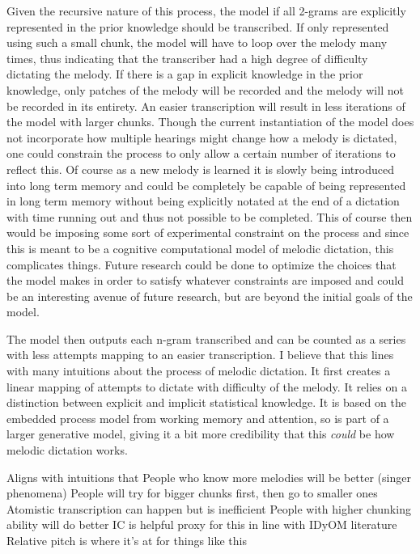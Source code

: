\documentclass[]{book}
\theoremstyle{definition}
\theoremstyle{definition}
\theoremstyle{definition}
\theoremstyle{remark}
\begin{document}
Given the recursive nature of this process, the model if all 2-grams are
explicitly represented in the prior knowledge should be transcribed. If
only represented using such a small chunk, the model will have to loop
over the melody many times, thus indicating that the transcriber had a
high degree of difficulty dictating the melody. If there is a gap in
explicit knowledge in the prior knowledge, only patches of the melody
will be recorded and the melody will not be recorded in its entirety. An
easier transcription will result in less iterations of the model with
larger chunks. Though the current instantiation of the model does not
incorporate how multiple hearings might change how a melody is dictated,
one could constrain the process to only allow a certain number of
iterations to reflect this. Of course as a new melody is learned it is
slowly being introduced into long term memory and could be completely be
capable of being represented in long term memory without being
explicitly notated at the end of a dictation with time running out and
thus not possible to be completed. This of course then would be imposing
some sort of experimental constraint on the process and since this is
meant to be a cognitive computational model of melodic dictation, this
complicates things. Future research could be done to optimize the
choices that the model makes in order to satisfy whatever constraints
are imposed and could be an interesting avenue of future research, but
are beyond the initial goals of the model.

The model then outputs each n-gram transcribed and can be counted as a
series with less attempts mapping to an easier transcription. I believe
that this lines with many intuitions about the process of melodic
dictation. It first creates a linear mapping of attempts to dictate with
difficulty of the melody. It relies on a distinction between explicit
and implicit statistical knowledge. It is based on the embedded process
model from working memory and attention, so is part of a larger
generative model, giving it a bit more credibility that this
\emph{could} be how melodic dictation works.

Aligns with intuitions that People who know more melodies will be better
(singer phenomena) People will try for bigger chunks first, then go to
smaller ones Atomistic transcription can happen but is inefficient
People with higher chunking ability will do better IC is helpful proxy
for this in line with IDyOM literature Relative pitch is where it's at
for things like this
\end{document}
